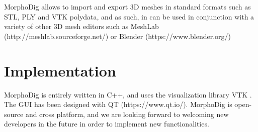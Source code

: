 \documentclass[12pt, a4paper]{book}
\begin{document}
 MorphoDig allows to import and export 3D meshes in standard formats such as STL, PLY and VTK polydata, and as such, in can be used in conjunction with a variety of other 3D mesh editors such  as MeshLab (http://meshlab.sourceforge.net/) or Blender (https://www.blender.org/) 
\section*{Implementation}
MorphoDig is entirely written in C++, and uses the visualization library VTK \citep{Avila2001}. The GUI has been designed with QT (https://www.qt.io/). MorphoDig is open-source and cross platform, and we are looking forward to welcoming new developers in the future in order to implement new functionalities. 


		 
		 		 
     
		 
	   
		 
		 
		 
		 
		 
		 
		 
		
		 
		 
		 

\cleardoublepage
{}

  		
\end{document}
